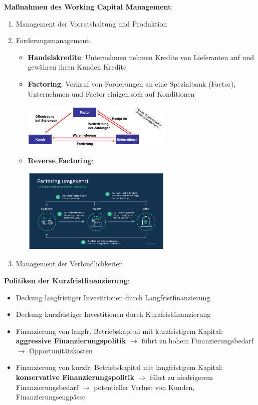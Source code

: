 \textbf{Maßnahmen des Working Capital Management}:
\begin{enumerate}
	\item Management der Vorratshaltung und Produktion
	\item Forderungsmanagement: 
	\begin{itemize}
		\item \textbf{Handelskredite}: Unternehmen nehmen Kredite von Lieferanten auf und gewähren ihren Kunden Kredite
		\item \textbf{Factoring}: Verkauf von Forderungen an eine Spezialbank (Factor), Unternehmen und Factor einigen sich auf Konditionen
		\begin{center}
			\includegraphics[width=0.6\textwidth]{images/factoring.png}
		\end{center}
		\pagebreak
		
		\item \textbf{Reverse Factoring}: 
		\begin{center}
			\includegraphics[width=0.6\textwidth]{images/reverse-factoring.png}
		\end{center}
	\end{itemize}
	\item Management der Verbindlichkeiten
\end{enumerate}
\bigskip
\textbf{Politiken der Kurzfristfinanzierung}:
\begin{itemize}
	\item Deckung langfristiger Investitionen durch Langfristfinanzierung
	\item Deckung kurzfristiger Investitionen durch Kurzfristfinanzierung
	\item Finanzierung von langfr. Betriebskapital mit kurzfristigem Kapital: \textbf{aggressive Finanzierungspolitik} $\rightarrow$ führt zu hohem Finanzierungsbedarf $\rightarrow$ Opportunitätskosten
	\item Finanzierung von kurzfr. Betriebskapital mit langfristigem Kapital: \textbf{konservative Finanzierungspolitik} $\rightarrow$ führt zu niedrigerem Finanzierungsbedarf $\rightarrow$ potentieller Verlust von Kunden, Finanzierungsengpässe
\end{itemize}

